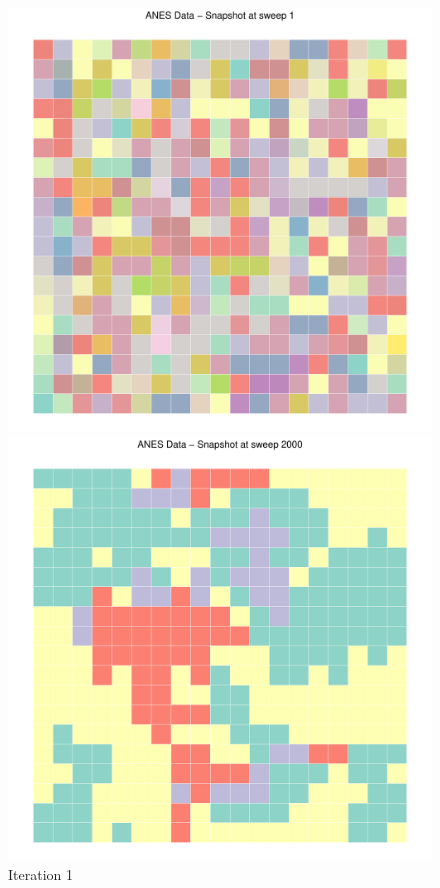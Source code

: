 \begin{figure}[htbp]
    \centering
    \begin{minipage}[b]{0.3\textwidth}
        \centering
        \includegraphics[width=\textwidth]{images/Axelrod_ANES_All_Snapshots-1.pdf}
        \caption*{Iteration 1}
    \end{minipage}
    \hfill
    \begin{minipage}[b]{0.3\textwidth}
        \centering
        \includegraphics[width=\textwidth]{images/Axelrod_ANES_All_Snapshots-2.pdf}

\end{minipage}
\end{figure}
